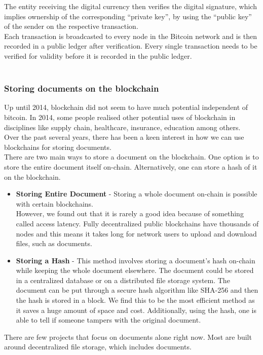 The entity receiving the digital currency then verifies the digital signature, which implies ownership of the corresponding “private key”, by using the “public key” of the sender on the respective transaction.\\
Each transaction is broadcasted to every node in the Bitcoin network and is then recorded in a public ledger after verification. Every single transaction needs to be verified for validity before it is recorded in the public ledger.\\\\
\subsubsection{Storing documents on the blockchain}
Up until 2014, blockchain did not seem to have much potential independent of bitcoin. In 2014, some people realised other potential uses of blockchain in disciplines like supply chain, healthcare, insurance, education among others.\\
Over the past several years, there has been a keen interest in how we can use blockchains for storing documents.\\
There are two main ways to store a document on the blockchain. One option is to store the entire document itself on-chain. Alternatively, one can store a hash of it on the blockchain.
\begin{itemize}
\item \textbf{Storing Entire Document} - Storing a whole document on-chain is possible with certain blockchains.\\
However, we found out that it is rarely a good idea because of something called access latency. Fully decentralized public blockchains have thousands of nodes and this means it takes long for network users to upload and download files, such as documents. 
\item \textbf{Storing a Hash} - This method involves storing a document’s hash on-chain while keeping the whole document elsewhere. The document could be stored in a centralized database or on a distributed file storage system. The document can be put through a secure hash algorithm like SHA-256 and then the hash is stored in a block. We find this to be the most efficient method as it saves a huge amount of space and cost. Additionally, using the hash, one is able to tell if someone tampers with the original document.
\end{itemize}
There are few projects that focus on documents alone right now. Most are built around decentralized file storage, which includes documents.\\\\
